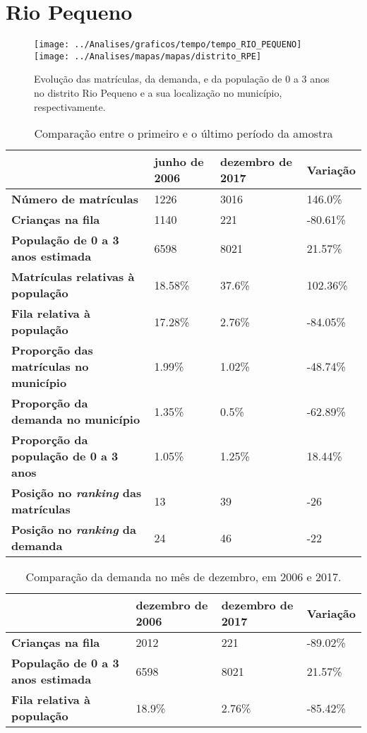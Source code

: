 \section{Rio Pequeno}
\begin{figure}[H]
\centering
\texttt{[image: ../Analises/graficos/tempo/tempo\_RIO\_PEQUENO]}
\texttt{[image: ../Analises/mapas/mapas/distrito\_RPE]}
\caption{Evolução das matrículas, da demanda, e da população de 0 a 3 anos no distrito Rio Pequeno e a sua localização no município, respectivamente.}
\end{figure}
\begin{table}[H]
\begin{tabular}{l|l|l|l}
\textbf{}                                      & \textbf{junho de 2006}       & \textbf{dezembro de 2017}    & \textbf{Variação} \\ \hline
\textbf{Número de matrículas}                  & 1226 & 3016 & 146.0\% \\ \hline
\textbf{Crianças na fila}                      & 1140 & 221 & -80.61\% \\ \hline
\textbf{População de 0 a 3 anos estimada}      & 6598 & 8021 & 21.57\% \\ \hline
\textbf{Matrículas relativas à população}      & 18.58\% & 37.6\% & 102.36\% \\ \hline
\textbf{Fila relativa à população}             & 17.28\% & 2.76\% & -84.05\% \\ \hline
\textbf{Proporção das matrículas no município} & 1.99\% & 1.02\% & -48.74\% \\ \hline
\textbf{Proporção da demanda no município}     & 1.35\% & 0.5\% & -62.89\% \\ \hline
\textbf{Proporção da população de 0 a 3 anos}  & 1.05\% & 1.25\% & 18.44\% \\ \hline
\textbf{Posição no \textit{ranking} das matrículas}     & 13 & 39 & -26 \\ \hline
\textbf{Posição no \textit{ranking} da demanda}         & 24 & 46 & -22 \\ 
\end{tabular}
\caption{Comparação entre o primeiro e o último período da amostra}
\end{table}
\begin{table}[H]
\begin{tabular}{l|l|l|l}
\textbf{}                                 & \textbf{dezembro de 2006} & \textbf{dezembro de 2017} & \textbf{Variação} \\ \hline
\textbf{Crianças na fila}                      & 2012 & 221 & -89.02\% \\ \hline
\textbf{População de 0 a 3 anos estimada}      & 6598 & 8021 & 21.57\% \\ \hline
\textbf{Fila relativa à população}             & 18.9\% & 2.76\% & -85.42\% \\
\end{tabular}
\caption{Comparação da demanda no mês de dezembro, em 2006 e 2017.}
\end{table}
